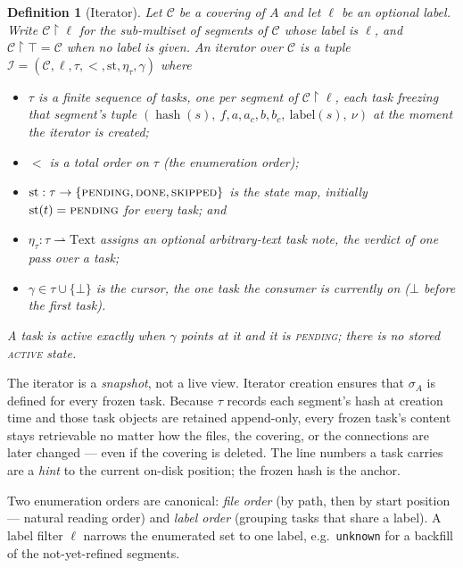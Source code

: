 \documentclass[11pt,a4paper]{article}
\newtheorem{definition}{Definition}[section]
\DeclareMathOperator{\hash}{hash}
\newcommand{\Cov}{\mathcal{C}}
\begin{document}
\begin{definition}[Iterator]\label{def:iterator}
Let $\Cov$ be a covering of $A$ and let $\ell$ be an optional label. Write
$\Cov \restriction \ell$ for the sub-multiset of segments of $\Cov$ whose
label is $\ell$, and $\Cov \restriction \top = \Cov$ when no label is
given. An \emph{iterator} over $\Cov$ is a tuple
$\mathcal{I} = (\Cov, \ell, \tau, <, \mathrm{st}, \eta_\tau, \gamma)$ where
\begin{itemize}[leftmargin=2em,itemsep=1pt]
\item $\tau$ is a finite sequence of \emph{tasks}, one per segment of
      $\Cov \restriction \ell$, each task freezing that segment's tuple
      $(\hash(s),\ f, a, a_c, b, b_c,\ \mathrm{label}(s),\ \nu)$ at the
      moment the iterator is created;
\item $<$ is a total order on $\tau$ (the enumeration order);
\item $\mathrm{st} : \tau \to \{\textsc{pending}, \textsc{done},
      \textsc{skipped}\}$ is the \emph{state map}, initially
      $\mathrm{st}(t) = \textsc{pending}$ for every task; and
\item $\eta_\tau : \tau \rightharpoonup \mathrm{Text}$ assigns an optional
      arbitrary-text \emph{task note}, the verdict of one pass over a task;
\item $\gamma \in \tau \cup \{\bot\}$ is the \emph{cursor}, the one task
      the consumer is currently on ($\bot$ before the first task).
\end{itemize}
A task is \emph{active} exactly when $\gamma$ points at it and it is
\textsc{pending}; there is no stored \textsc{active} state.
\end{definition}

The iterator is a \emph{snapshot}, not a live view. Iterator creation ensures
that $\sigma_A$ is defined for every frozen task. Because $\tau$ records each
segment's hash at creation time and those task objects are retained
append-only, every frozen task's content stays retrievable no matter how the
files, the covering, or the connections are later changed --- even if the
covering is deleted. The line numbers a task carries are a \emph{hint} to the
current on-disk position; the frozen hash is the anchor.

Two enumeration orders are canonical: \emph{file order} (by path, then by
start position --- natural reading order) and \emph{label order} (grouping
tasks that share a label). A label filter $\ell$ narrows the enumerated set
to one label, e.g.\ \texttt{unknown} for a backfill of the not-yet-refined
segments.
\end{document}
